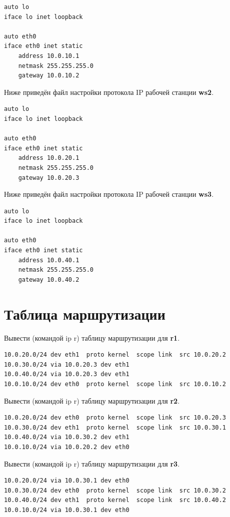 \documentclass[a4paper,12pt]{article}
\begin{document}
\begin{Verbatim}
auto lo
iface lo inet loopback

auto eth0
iface eth0 inet static
	address 10.0.10.1
	netmask 255.255.255.0
	gateway 10.0.10.2
\end{Verbatim}


Ниже приведён файл настройки протокола IP рабочей станции \textbf{ws2}.

\begin{Verbatim}
auto lo
iface lo inet loopback

auto eth0
iface eth0 inet static
	address 10.0.20.1
	netmask 255.255.255.0
	gateway 10.0.20.3
\end{Verbatim}

Ниже приведён файл настройки протокола IP рабочей станции \textbf{ws3}.

\begin{Verbatim}
auto lo
iface lo inet loopback

auto eth0
iface eth0 inet static
	address 10.0.40.1
	netmask 255.255.255.0
	gateway 10.0.40.2
\end{Verbatim}

\section{Таблица маршрутизации}

Вывести (командой ip r) таблицу маршрутизации для \textbf{r1}.

\begin{Verbatim}
10.0.20.0/24 dev eth1  proto kernel  scope link  src 10.0.20.2 
10.0.30.0/24 via 10.0.20.3 dev eth1 
10.0.40.0/24 via 10.0.20.3 dev eth1 
10.0.10.0/24 dev eth0  proto kernel  scope link  src 10.0.10.2 
\end{Verbatim}

Вывести (командой ip r) таблицу маршрутизации для \textbf{r2}.

\begin{Verbatim}
10.0.20.0/24 dev eth0  proto kernel  scope link  src 10.0.20.3 
10.0.30.0/24 dev eth1  proto kernel  scope link  src 10.0.30.1 
10.0.40.0/24 via 10.0.30.2 dev eth1 
10.0.10.0/24 via 10.0.20.2 dev eth0 
\end{Verbatim}

Вывести (командой ip r) таблицу маршрутизации для \textbf{r3}.

\begin{Verbatim}
10.0.20.0/24 via 10.0.30.1 dev eth0 
10.0.30.0/24 dev eth0  proto kernel  scope link  src 10.0.30.2 
10.0.40.0/24 dev eth1  proto kernel  scope link  src 10.0.40.2 
10.0.10.0/24 via 10.0.30.1 dev eth0 
\end{Verbatim}
\end{document}
